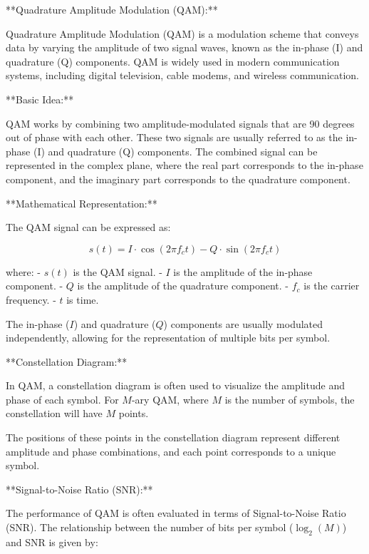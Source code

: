 \documentclass[../../../../DMCC-My-Notebook]{subfiles}
\begin{document}
	
	
	
	
	
	
	
	
	
	
	
	
	**Quadrature Amplitude Modulation (QAM):**
	
	Quadrature Amplitude Modulation (QAM) is a modulation scheme that conveys data by varying the amplitude of two signal waves, known as the in-phase (I) and quadrature (Q) components. QAM is widely used in modern communication systems, including digital television, cable modems, and wireless communication.
	
	**Basic Idea:**
	
	QAM works by combining two amplitude-modulated signals that are 90 degrees out of phase with each other. These two signals are usually referred to as the in-phase (I) and quadrature (Q) components. The combined signal can be represented in the complex plane, where the real part corresponds to the in-phase component, and the imaginary part corresponds to the quadrature component.
	
	**Mathematical Representation:**
	
	The QAM signal can be expressed as:
	
	\[ s(t) = I \cdot \cos(2\pi f_c t) - Q \cdot \sin(2\pi f_c t) \]
	
	where:
	- \( s(t) \) is the QAM signal.
	- \( I \) is the amplitude of the in-phase component.
	- \( Q \) is the amplitude of the quadrature component.
	- \( f_c \) is the carrier frequency.
	- \( t \) is time.
	
	The in-phase (\( I \)) and quadrature (\( Q \)) components are usually modulated independently, allowing for the representation of multiple bits per symbol.
	
	**Constellation Diagram:**
	
	In QAM, a constellation diagram is often used to visualize the amplitude and phase of each symbol. For \( M \)-ary QAM, where \( M \) is the number of symbols, the constellation will have \( M \) points.
	
	The positions of these points in the constellation diagram represent different amplitude and phase combinations, and each point corresponds to a unique symbol.
	
	**Signal-to-Noise Ratio (SNR):**
	
	The performance of QAM is often evaluated in terms of Signal-to-Noise Ratio (SNR). The relationship between the number of bits per symbol (\( \log_2(M) \)) and SNR is given by:
	
\end{document}
